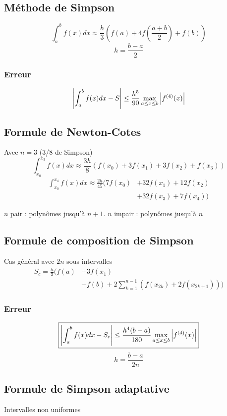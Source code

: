 \documentclass[resume]{subfiles}
\begin{document}
	\subsection{Méthode de Simpson}
	$$\boxed{\int_a^{b}f(x)dx\approx \frac{h}{3}\left(f(a)+4f\left(\frac{a+b}{2}\right)+f(b)\right)}$$
	$$h=\frac{b-a}{2}$$
	\subsubsection{Erreur}
	$$\abs{\int_a^bf(x)dx-S}\leq \frac{h^5}{90}\max_{a\leq x\leq b}\abs{f^{(4)}(x)}$$
	\subsection{Formule de Newton-Cotes}
	Avec $n=3$ (3/8 de Simpson)
	$$\int_{x_0}^{x_3}f(x)dx\approx \frac{3h}{8}\left(f(x_0)+3f(x_1)+3f(x_2)+f(x_3)\right)$$
	\begin{align*}
	\int_{x_0}^{x_4}f(x)dx\approx \frac{2h}{45} \Big(7f(x_0)&+32f(x_1)+12f(x_2)\\ &+32f(x_3)+7f(x_4)\Big)
	\end{align*}
	
	
	$n$ pair : polynômes jusqu'à $n+1$. $n$ impair : polynômes jusqu'à $n$
	\subsection{Formule de composition de Simpson}
	Cas général avec $2n$ sous intervalles
	$$\boxed{\begin{split}S_c=\frac{h}{3}\Big(f(a)&+3f(x_1)\\&+f(b)+2\sum_{k=1}^{n-1}\left(f(x_{2k})+2f(x_{2k+1})\right)\Big)\end{split}}$$
	\subsubsection{Erreur}
	$$\boxed{\abs{\int_a^bf(x)dx-S_c}\leq \frac{h^4(b-a)}{180}\max_{a\leq x\leq b}\abs{f^{(4)}(x)}}$$
	$$h=\frac{b-a}{2n}$$
	\subsection{Formule de Simpson adaptative}
	Intervalles non uniformes
\end{document}

